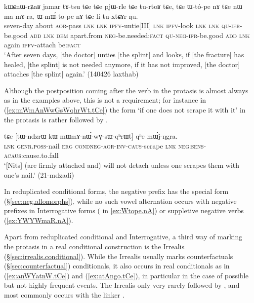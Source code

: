 \begin{exe}
\ex \label{ex:Wtope.nA}
 \gll   kɯɕnɯ-rʑaʁ jamar tɤ-tsu tɕe tɕe pjɯ-rle tɕe tu-rtoʁ tɕe, tɕe ɯ-tó-pe nɤ tɕe nɯ ma mɤ-ra,
ɯ-mɯ́-to-pe nɤ tɕe li tu-xtɕɤr ŋu. \\
seven-day about \textsc{aor}-pass \textsc{lnk} \textsc{lnk} \textsc{ipfv}-untie[III] \textsc{lnk} \textsc{ipfv}-look \textsc{lnk} \textsc{lnk} \textsc{qu}-\textsc{ifr}-be.good \textsc{add} \textsc{lnk} \textsc{dem} apart.from \textsc{neg}-be.needed:\textsc{fact} \textsc{qu}-\textsc{neg}-\textsc{ifr}-be.good \textsc{add} \textsc{lnk} again \textsc{ipfv}-attach be:\textsc{fact} \\
\glt `After seven days, [the doctor] unties [the splint] and looks, if [the fracture] has healed, [the splint] is not needed anymore, if it has not improved, [the doctor] attaches [the splint] again.' (140426 laxthab)
\end{exe}
 
Although the postposition coming after the verb in the protasis is almost always  as in the examples above, this is not a requirement; for instance in (\ref{ex:mWmAnWwGsWqhrWt.tCe}) the form  `if one does not scrape it with it' in the protasis is rather followed by .

 \begin{exe}
\ex \label{ex:mWmAnWwGsWqhrWt.tCe}
 \gll tɕe [tɯ-ndzrɯ kɯ mɯ\redp{}mɤ-nɯ́-wɣ-sɯ-qʰrɯt] qʰe mɯ́j-ŋgra. \\
 \textsc{lnk} \textsc{genr}.\textsc{poss}-nail \textsc{erg} \textsc{cond}\redp{}\textsc{neg}-\textsc{aor}-\textsc{inv}-\textsc{caus}-scrape \textsc{lnk} \textsc{neg}:\textsc{sens}-\textsc{acaus}:cause.to.fall \\
 \glt `[Nits] (are firmly attached and) will not detach unless one scrapes them with one's nail.' (21-mdzadi)
 \end{exe}

In reduplicated conditional forms, the negative prefix  has the special form  (§\ref{sec:neg.allomorphs}), while no such vowel alternation occurs with negative prefixes in Interrogative forms ( in \ref{ex:Wtope.nA}) or suppletive negative verbs (\ref{ex:YWYWmaR.nA}).

Apart from reduplicated conditional and Interrogative, a third way of marking the protasis in a real conditional construction is the Irrealis (§\ref{sec:irrealis.conditional}). While the Irrealis usually marks counterfactuals (§\ref{sec:counterfactual}) conditionals, it also occurs in real conditionals as in (\ref{ex:anWYatnW.tCe}) and (\ref{ex:atAngo.tCe}), in particular in the case of possible but not highly frequent events. The Irrealis only very rarely followed by , and most commonly occurs with the linker .

